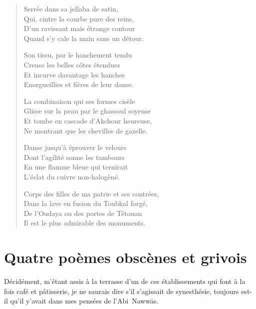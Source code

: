 \begin{verse}
Serrée dans sa jellaba de satin,\\
Qui, cintre la courbe pure des reins,\\
D’un ravissant mais étrange contour\\
Quand s’y cale la main sans un détour.

Son tissu, par le hanchement tendu\\
Creuse les belles côtes étendues\\
Et incurve davantage les hanches\\
Enorgueillies et fières de leur danse.

La combinaison qui ses formes cisèle\\
Glisse sur la peau par le ghassoul soyeuse\\
Et tombe en cascade d’Akchour heureuse,\\
Ne montrant que les chevilles de gazelle.

Danse jusqu’à éprouver le velours\\
Dont l’agilité sonne les tambours\\
En une flamme bleue qui ternirait\\
L’éclat du cuivre non-halogèné.

Corps des filles de ma patrie et ses contrées,\\
Dans la lave en fusion du Toubkal forgé,\\
De l’Oudaya ou des portes de Tétouan\\
Il est le plus admirable des monuments.
\end{verse}

\section*{Quatre poèmes obscènes et grivois}
\begin{prose}
Décidément, m’étant assis à la terrasse d’un de ces établissements qui font à la fois café et pâtisserie, je ne saurais dire s’il s’agissait de synesthésie, toujours est-il qu’il y’avait dans mes pensées de l’Abi~Nawwās.
\end{prose}

